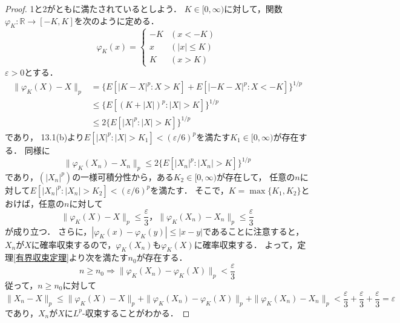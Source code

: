 \documentclass{jsarticle}
\begin{document}
\begin{proof}
1と2がともに満たされているとしよう．
$K\in[0,\infty)$に対して，関数$\varphi_K\colon\mathbb{R}\to[-K,K]$を次のように定める．
\[
\varphi_K(x)=
\begin{cases}
-K & (x<-K) \\
x & (|x|\leq K) \\
K & (x>K)
\end{cases}
\]
$\varepsilon>0$とする．
\begin{align*}
\|\varphi_K(X)-X\|_p
&=\{E[|K-X|^p:X>K]+E[|-K-X|^p:X<-K]\}^{1/p} \\
&\leq\{E[(K+|X|)^p:|X|>K]\}^{1/p} \\
&\leq2\{E[|X|^p:|X|>K]\}^{1/p}
\end{align*}
であり，
13.1(b)より$E[|X|^p:|X|>K_1]<(\varepsilon/6)^p$を満たす$K_1\in[0,\infty)$が存在する．
同様に
\[
\|\varphi_K(X_n)-X_n\|_p\leq2\{E[|X_n|^p:|X_n|>K]\}^{1/p}
\]
であり，$(|X_n|^p)$の一様可積分性から，ある$K_2\in[0,\infty)$が存在して，
任意の$n$に対して$E[|X_n|^p:|X_n|>K_2]<(\varepsilon/6)^p$を満たす．
そこで，$K=\max\{K_1,K_2\}$とおけば，任意の$n$に対して
\[
\|\varphi_K(X)-X\|_p\leq\frac{\varepsilon}{3}，
\|\varphi_K(X_n)-X_n\|_p\leq\frac{\varepsilon}{3}
\]
が成り立つ．
さらに，$|\varphi_K(x)-\varphi_K(y)|\leq|x-y|$であることに注意すると，
$X_n$が$X$に確率収束するので，$\varphi_K(X_n)$も$\varphi_K(X)$に確率収束する．
よって，定理\ref{有界収束定理}より次を満たす$n_0$が存在する．
\[
n\geq n_0
\Rightarrow
\|\varphi_K(X_n)-\varphi_K(X)\|_p<\frac{\varepsilon}{3}
\]
従って，$n\geq n_0$に対して
\[
\|X_n-X\|_p
\leq\|\varphi_K(X)-X\|_p+\|\varphi_K(X_n)-\varphi_K(X)\|_p+\|\varphi_K(X_n)-X_n\|_p
<\frac{\varepsilon}{3}+\frac{\varepsilon}{3}+\frac{\varepsilon}{3}
=\varepsilon
\]
であり，$X_n$が$X$に$L^p$-収束することがわかる．


\end{proof}
\end{document}
